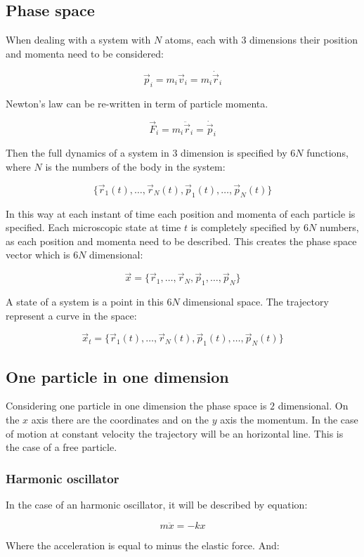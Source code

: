	\subsection{Phase space}
	When dealing with a system with $N$ atoms, each with $3$ dimensions their position and momenta need to be considered:

	$$\vec{p}_i = m_i\vec{v}_i = m_i\dot{\vec{r}}_i$$

	Newton's law can be re-written in term of particle momenta.

	$$\vec{F}_i = m_i\ddot{\vec{r}}_i = \dot{\vec{p}}_i$$

	Then the full dynamics of a system in $3$ dimension is specified by $6N$ functions, where $N$ is the numbers of the body in the system:

	$$\{\vec{r}_1(t), \dots, \vec{r}_N(t), \vec{p}_1(t), \dots, \vec{p}_N(t)\}$$

	In this way at each instant of time each position and momenta of each particle is specified.
	Each microscopic state at time $t$ is completely specified by $6N$ numbers, as each position and momenta need to be described.
	This creates the phase space vector which is $6N$ dimensional:

	$$\vec{x} = \{\vec{r}_1, \dots, \vec{r}_N, \vec{p}_1, \dots, \vec{p}_N\}$$

	A state of a system is a point in this $6N$ dimensional space.
	The trajectory represent a curve in the space:

	$$\vec{x}_t = \{\vec{r}_1(t), \dots, \vec{r}_N(t), \vec{p}_1(t), \dots, \vec{p}_N(t)\}$$

	\subsection{One particle in one dimension}
	Considering one particle in one dimension the phase space is $2$ dimensional.
	On the $x$ axis there are the coordinates and on the $y$ axis the momentum.
	In the case of motion at constant velocity the trajectory will be an horizontal line.
	This is the case of a free particle.

		\subsubsection{Harmonic oscillator}
		In the case of an harmonic oscillator, it will be described by equation:

		$$m\ddot{x} = -kx$$

		Where the acceleration is equal to minus the elastic force.
		And:

